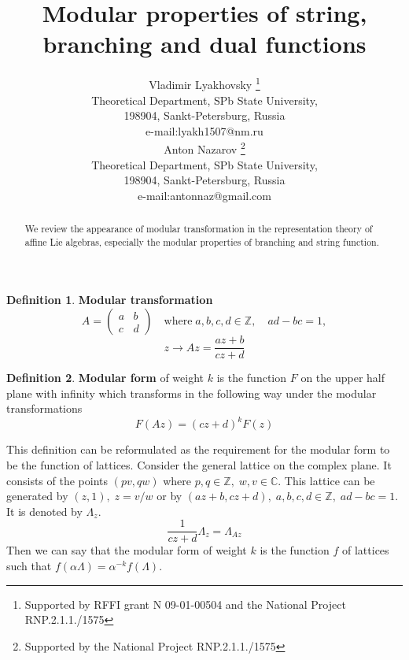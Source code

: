 \documentclass[a4paper,12pt]{article}
\theoremstyle{definition} \newtheorem{Def}{Definition}
\begin{document}
\title{Modular properties of string, branching and dual functions}

\author{Vladimir Lyakhovsky \thanks{ Supported by
 RFFI grant N 09-01-00504 and the National Project RNP.2.1.1./1575 }\\
Theoretical Department, SPb State University,\\
198904, Sankt-Petersburg, Russia \\
e-mail:lyakh1507@nm.ru \\
[5mm] Anton Nazarov \thanks{ Supported by
the National Project RNP.2.1.1./1575 }\\
Theoretical Department, SPb State University,\\
198904, Sankt-Petersburg, Russia \\
e-mail:antonnaz@gmail.com
}
\maketitle

\begin{abstract}
  We review the appearance of modular transformation in the representation theory of affine Lie algebras, especially the modular properties of branching and string function.
\end{abstract}
\begin{Def}
  {\bf Modular transformation}
  \begin{equation}
    \label{eq:1}
    A=
    \begin{pmatrix} a & b\\ c & d
    \end{pmatrix} \quad\mbox{where}\; a,b,c,d\in\mathbb{Z},\quad ad-bc=1,
  \end{equation}
  \begin{equation}
    \label{eq:2}
    z\to A z=\frac{az+b}{cz+d}
  \end{equation}
\end{Def}
\begin{Def}
  {\bf Modular form} of weight $k$ is the function $F$ on the upper half plane with infinity which transforms in the following way under the modular transformations
  \begin{equation}
    \label{eq:3}
    F(Az)=(cz+d)^k F(z)
  \end{equation}
\end{Def}

This definition can be reformulated as the requirement for the modular form to be the function of lattices. 
Consider the general lattice on the complex plane. It consists of the points $(pv,qw)$ where $p,q\in \mathbb{Z},\; w,v\in \mathbb{C}$. This lattice can be generated by $(z,1), \; z=v/w$ or by $(az+b,cz+d), \; a,b,c,d\in\mathbb{Z},\; ad-bc=1$. It is denoted by $\Lambda_z$.
\begin{equation}
  \label{eq:4}
  \frac{1}{cz+d}\Lambda_z=\Lambda_{Az}
\end{equation}
Then we can say that the modular form of weight $k$ is the function $f$ of lattices such that $f(\alpha\Lambda)=\alpha^{-k}f(\Lambda)$.
\end{document}
